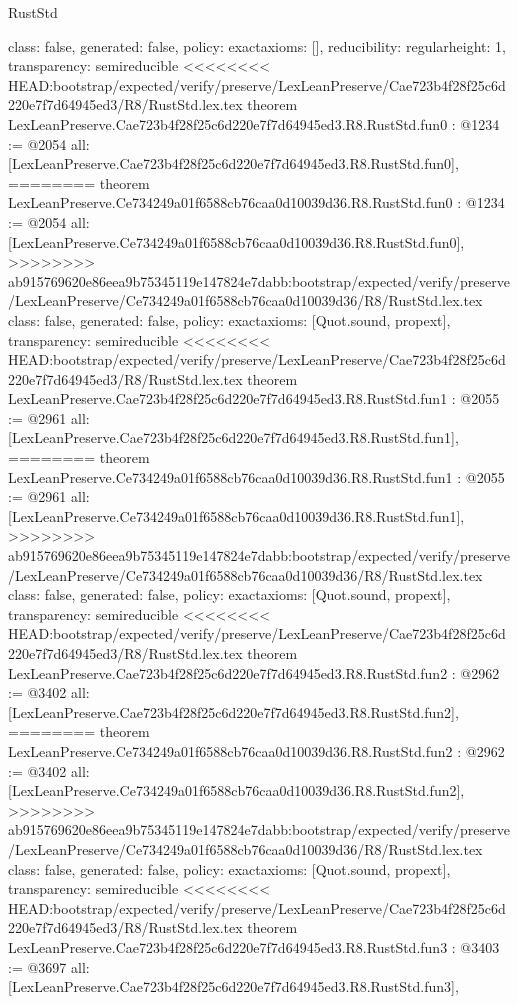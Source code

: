 \begin{lexlean}{RustStd}
\begin{coremodule}
{\begin{coremodule}
{{{  class: false,
  generated: false,
  policy: exact{axioms: []},
  reducibility: regular{height: 1},
  transparency: semireducible
}
<<<<<<<< HEAD:bootstrap/expected/verify/preserve/LexLeanPreserve/Cae723b4f28f25c6d220e7f7d64945ed3/R8/RustStd.lex.tex
theorem LexLeanPreserve.Cae723b4f28f25c6d220e7f7d64945ed3.R8.RustStd.fun0 : @1234 := @2054 {
  all: [LexLeanPreserve.Cae723b4f28f25c6d220e7f7d64945ed3.R8.RustStd.fun0],
========
theorem LexLeanPreserve.Ce734249a01f6588cb76caa0d10039d36.R8.RustStd.fun0 : @1234 := @2054 {
  all: [LexLeanPreserve.Ce734249a01f6588cb76caa0d10039d36.R8.RustStd.fun0],
>>>>>>>> ab915769620e86eea9b75345119e147824e7dabb:bootstrap/expected/verify/preserve/LexLeanPreserve/Ce734249a01f6588cb76caa0d10039d36/R8/RustStd.lex.tex
  class: false,
  generated: false,
  policy: exact{axioms: [Quot.sound, propext]},
  transparency: semireducible
}
<<<<<<<< HEAD:bootstrap/expected/verify/preserve/LexLeanPreserve/Cae723b4f28f25c6d220e7f7d64945ed3/R8/RustStd.lex.tex
theorem LexLeanPreserve.Cae723b4f28f25c6d220e7f7d64945ed3.R8.RustStd.fun1 : @2055 := @2961 {
  all: [LexLeanPreserve.Cae723b4f28f25c6d220e7f7d64945ed3.R8.RustStd.fun1],
========
theorem LexLeanPreserve.Ce734249a01f6588cb76caa0d10039d36.R8.RustStd.fun1 : @2055 := @2961 {
  all: [LexLeanPreserve.Ce734249a01f6588cb76caa0d10039d36.R8.RustStd.fun1],
>>>>>>>> ab915769620e86eea9b75345119e147824e7dabb:bootstrap/expected/verify/preserve/LexLeanPreserve/Ce734249a01f6588cb76caa0d10039d36/R8/RustStd.lex.tex
  class: false,
  generated: false,
  policy: exact{axioms: [Quot.sound, propext]},
  transparency: semireducible
}
<<<<<<<< HEAD:bootstrap/expected/verify/preserve/LexLeanPreserve/Cae723b4f28f25c6d220e7f7d64945ed3/R8/RustStd.lex.tex
theorem LexLeanPreserve.Cae723b4f28f25c6d220e7f7d64945ed3.R8.RustStd.fun2 : @2962 := @3402 {
  all: [LexLeanPreserve.Cae723b4f28f25c6d220e7f7d64945ed3.R8.RustStd.fun2],
========
theorem LexLeanPreserve.Ce734249a01f6588cb76caa0d10039d36.R8.RustStd.fun2 : @2962 := @3402 {
  all: [LexLeanPreserve.Ce734249a01f6588cb76caa0d10039d36.R8.RustStd.fun2],
>>>>>>>> ab915769620e86eea9b75345119e147824e7dabb:bootstrap/expected/verify/preserve/LexLeanPreserve/Ce734249a01f6588cb76caa0d10039d36/R8/RustStd.lex.tex
  class: false,
  generated: false,
  policy: exact{axioms: [Quot.sound, propext]},
  transparency: semireducible
}
<<<<<<<< HEAD:bootstrap/expected/verify/preserve/LexLeanPreserve/Cae723b4f28f25c6d220e7f7d64945ed3/R8/RustStd.lex.tex
theorem LexLeanPreserve.Cae723b4f28f25c6d220e7f7d64945ed3.R8.RustStd.fun3 : @3403 := @3697 {
  all: [LexLeanPreserve.Cae723b4f28f25c6d220e7f7d64945ed3.R8.RustStd.fun3],
}}}}}}
\end{coremodule}}
\end{coremodule}
\end{lexlean}
